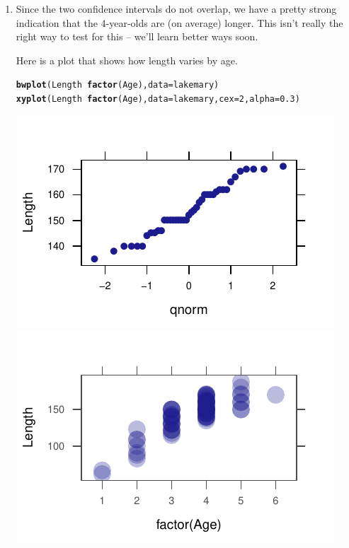 \documentclass[twoside]{book}\usepackage[]{graphicx}\usepackage[]{xcolor}
\makeatletter
\def\maxwidth{ %
  \ifdim\Gin@nat@width>\linewidth
    \linewidth
  \else
    \Gin@nat@width
  \fi
}
\newcommand{\hlnum}[1]{\textcolor[rgb]{0.686,0.059,0.569}{#1}}%
\newcommand{\hlopt}[1]{\textcolor[rgb]{0,0,0}{#1}}%
\newcommand{\hlstd}[1]{\textcolor[rgb]{0.345,0.345,0.345}{#1}}%
\newcommand{\hlkwc}[1]{\textcolor[rgb]{0.333,0.667,0.333}{#1}}%
\newcommand{\hlkwd}[1]{\textcolor[rgb]{0.737,0.353,0.396}{\textbf{#1}}}%
\newenvironment{kframe}{%
 \def\at@end@of@kframe{}%
 \ifinner\ifhmode%
  \def\at@end@of@kframe{\end{minipage}}%
  \begin{minipage}{\columnwidth}%
 \fi\fi%
 \def\FrameCommand##1{\hskip\@totalleftmargin \hskip-\fboxsep
 \colorbox{shadecolor}{##1}\hskip-\fboxsep
     \hskip-\linewidth \hskip-\@totalleftmargin \hskip\columnwidth}%
 \MakeFramed {\advance\hsize-\width
   \@totalleftmargin\z@ \linewidth\hsize
   \@setminipage}}%
 {\par\unskip\endMakeFramed%
 \at@end@of@kframe}
\newenvironment{knitrout}{}{} %
\makeatother
\begin{document}
\begin{solution}
\begin{enumerate}
\begin{knitrout}
{}



\end{knitrout}
	\item
		Since the two confidence intervals do not overlap, we have a pretty strong
		indication that the 4-year-olds are (on average) longer.  This isn't really
		the right way to test for this -- we'll learn better ways soon.

		Here is a plot that shows how length varies by age.
\begin{knitrout}
\color{fgcolor}\begin{kframe}
\begin{alltt}
\hlkwd{bwplot}\hlstd{(Length} \hlopt{~} \hlkwd{factor}\hlstd{(Age),} \hlkwc{data} \hlstd{= lakemary)}
\hlkwd{xyplot}\hlstd{(Length} \hlopt{~} \hlkwd{factor}\hlstd{(Age),} \hlkwc{data} \hlstd{= lakemary,} \hlkwc{cex} \hlstd{=} \hlnum{2}\hlstd{,} \hlkwc{alpha} \hlstd{=} \hlnum{0.3}\hlstd{)}
\end{alltt}
\end{kframe}

{\centering \includegraphics[width=\maxwidth]{figures/fig-unnamed-chunk-148-1} 
\includegraphics[width=\maxwidth]{figures/fig-unnamed-chunk-148-2} 

}



\end{knitrout}
\end{enumerate}
\end{solution}
\end{document}
